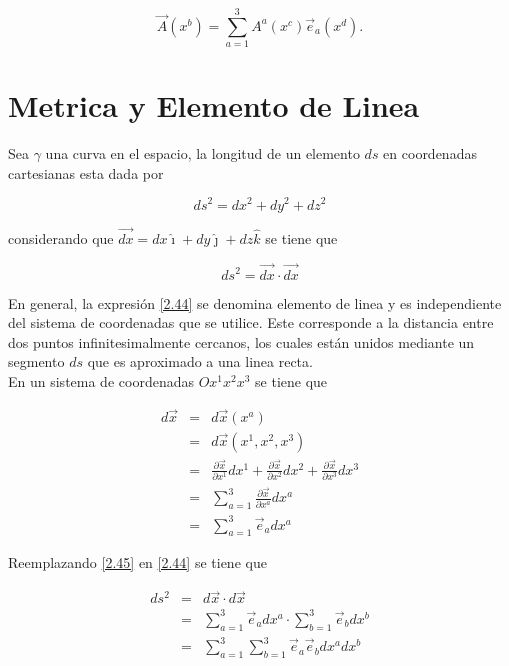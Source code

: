 \documentclass[12pt]{report}
\begin{document}
\begin{equation} \nonumber
 \vec{A}(x^b) = \sum_{a=1}^3 A^a(x^c) \vec{e}_a (x^d).
\end{equation}








\section{Metrica y Elemento de Linea}

Sea $\gamma $ una curva en el espacio, la longitud de un elemento $ds$ en coordenadas cartesianas esta dada por

\begin{equation}
ds^2=dx^2 +  dy^2 + dz^2
\end{equation}

considerando que $\vec{dx}=dx\hat{\imath}+dy\hat{\jmath}+ dz\hat{k}$ se tiene que 

\begin{equation} \label{2.44}
ds^2 = \vec{dx} \cdot \vec{dx} 
\end{equation}

 En general, la expresión \eqref{2.44} se denomina elemento de linea y es independiente del sistema de coordenadas que se utilice. Este corresponde a la distancia entre dos puntos infinitesimalmente  cercanos, los cuales están unidos mediante un segmento $ds$ que es aproximado a una linea recta. \\

En un sistema de coordenadas  $ O  x^1 x^2 x^3$ se tiene que 


\begin{eqnarray}
d\vec{x}&=& d\vec{x}(x^a) \nonumber \\
&=&d\vec{x}(x^1,x^2,x^3) \nonumber \\
&=&\frac{\partial\vec{x}}{\partial x^1}dx^1+\frac{\partial \vec{x}}{\partial x^2}dx^2 + \frac{\partial \vec{x}}{\partial x^3}dx^3 \nonumber \\
&=& \displaystyle\sum_{a=1}^3 \frac{\partial \vec{x}}{\partial x^a}dx^a \nonumber \\ \label{2.45}
&=& \displaystyle\sum_{a=1}^3 \vec{e}_a dx^a 
\end{eqnarray}

Reemplazando \eqref{2.45} en \eqref{2.44} se tiene que 

\begin{eqnarray}
ds^2&=& d\vec{x} \cdot d\vec{x} \nonumber \\
&=& \displaystyle\sum_{a=1}^3 \vec{e}_a dx^a \cdot \displaystyle\sum_{b=1}^3 \vec{e}_b dx^b \nonumber \\  \label{2.46}
&=& \displaystyle\sum_{a=1}^3\displaystyle\sum_{b=1}^3\vec{e}_a\vec{e}_b dx^a dx^b
\end{eqnarray}
\end{document}
